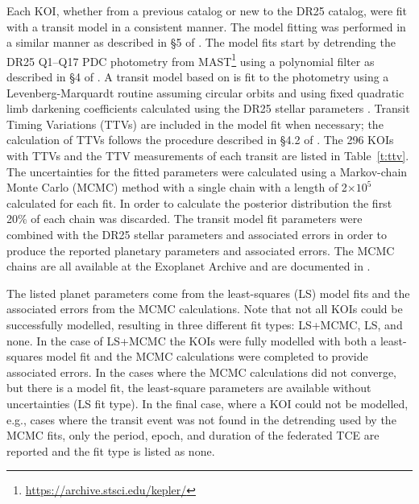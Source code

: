 \label{s:mcmc}

Each KOI, whether from a previous catalog or new to the DR25 catalog, were fit with a transit model in a consistent manner. The model fitting was performed in a similar manner as described in \S5 of \citet{Rowe2015cat}. The model fits start by detrending the DR25 Q1--Q17 PDC photometry from MAST\footnote{\url{https://archive.stsci.edu/kepler/}} using a polynomial filter as described in \S4 of \citet{Rowe2014}. A transit model based on \citet{Mandel2002} is fit to the photometry using a Levenberg-Marquardt routine \citep{More1980} assuming circular orbits and using fixed quadratic limb darkening coefficients \citep{Claret2011} calculated using the DR25 stellar parameters \citep{Mathur2017ApJS}. Transit Timing Variations (TTVs) are included in the model fit when necessary; the calculation of TTVs follows the procedure described in \S4.2 of \citet{Rowe2014}. The 296 KOIs with TTVs and the TTV measurements of each transit are listed in Table~\ref{t:ttv}. The uncertainties for the fitted parameters were calculated using a Markov-chain Monte Carlo (MCMC) method \citep{Ford2005AJ} with a single chain with a length of 2$\times 10^{5}$ calculated for each fit. In order to calculate the posterior distribution the first 20\% of each chain was discarded. The transit model fit parameters were combined with the DR25 stellar parameters and associated errors \citep{Mathur2017ApJS} in order to produce the reported planetary parameters and associated errors. The MCMC chains are all available at the Exoplanet Archive and are documented in \citet{Hoffman2017}. 

The listed planet parameters come from the least-squares (LS) model fits and the associated errors from the MCMC calculations. Note that not all KOIs could be successfully modelled, resulting in three different fit types: LS+MCMC, LS, and none. In the case of LS+MCMC the KOIs were fully modelled with both a least-squares model fit and the MCMC calculations were completed to provide associated errors. In the cases where the MCMC calculations did not converge, but there is a model fit, the least-square parameters are available without uncertainties (LS fit type). In the final case, where a KOI could not be modelled, e.g., cases where the transit event was not found in the detrending used by the MCMC fits, only the period, epoch, and duration of the federated TCE are reported and the fit type is listed as none.

